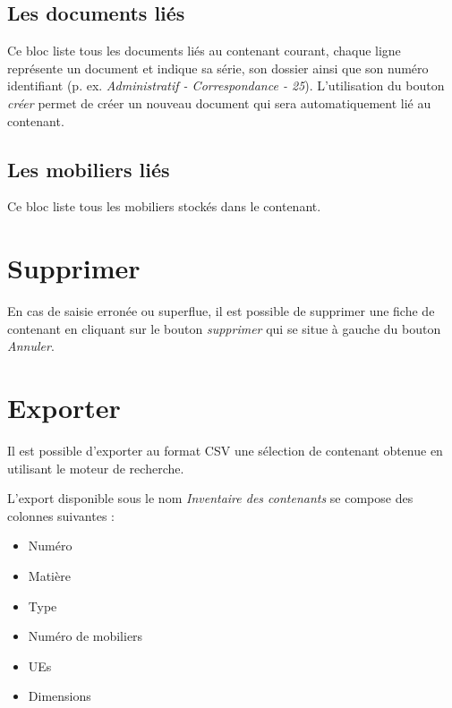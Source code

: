 \documentclass[letterpaper,10pt,french]{sphinxmanual}
\begin{document}
\subsection{Les documents liés}
\label{manuel/formulaire_contenant:les-documents-lies}
Ce bloc liste tous les documents liés au contenant courant, chaque ligne représente un document et indique sa série, son dossier ainsi que son numéro identifiant (p. ex. \emph{Administratif - Correspondance - 25}). L'utilisation du bouton \emph{créer} permet de créer un nouveau document qui sera automatiquement lié au contenant.


\subsection{Les mobiliers liés}
\label{manuel/formulaire_contenant:les-mobiliers-lies}
Ce bloc liste tous les mobiliers stockés dans le contenant.


\section{Supprimer}
\label{manuel/formulaire_contenant:supprimer}
En cas de saisie erronée ou superflue, il est possible de supprimer une fiche de contenant en cliquant sur le bouton \emph{supprimer} qui se situe à gauche du bouton \emph{Annuler}.


\section{Exporter}
\label{manuel/formulaire_contenant:exporter}
Il est possible d'exporter au format CSV une sélection de contenant obtenue en utilisant le moteur de recherche.

L'export disponible sous le nom \emph{Inventaire des contenants} se compose des colonnes suivantes :
\begin{itemize}
\item {} 
Numéro

\item {} 
Matière

\item {} 
Type

\item {} 
Numéro de mobiliers

\item {} 
UEs

\item {} 
Dimensions

\end{itemize}
\end{document}
